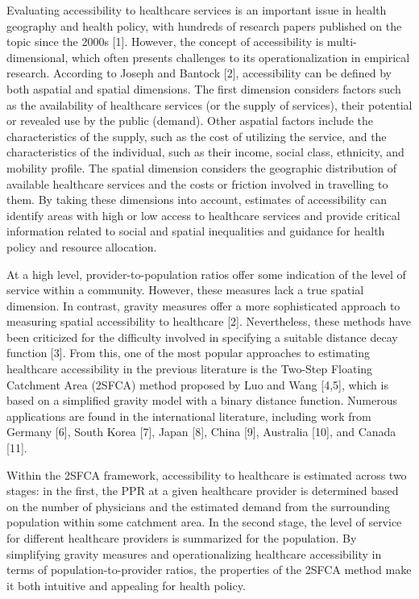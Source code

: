 \documentclass[10pt,letterpaper]{article}
\begin{document}
Evaluating accessibility to healthcare services is an important issue in
health geography and health policy, with hundreds of research papers
published on the topic since the 2000s {[}1{]}. However, the concept of
accessibility is multi-dimensional, which often presents challenges to
its operationalization in empirical research. According to Joseph and
Bantock {[}2{]}, accessibility can be defined by both aspatial and
spatial dimensions. The first dimension considers factors such as the
availability of healthcare services (or the supply of services), their
potential or revealed use by the public (demand). Other aspatial factors
include the characteristics of the supply, such as the cost of utilizing
the service, and the characteristics of the individual, such as their
income, social class, ethnicity, and mobility profile. The spatial
dimension considers the geographic distribution of available healthcare
services and the costs or friction involved in travelling to them. By
taking these dimensions into account, estimates of accessibility can
identify areas with high or low access to healthcare services and
provide critical information related to social and spatial inequalities
and guidance for health policy and resource allocation.

At a high level, provider-to-population ratios offer some indication of
the level of service within a community. However, these measures lack a
true spatial dimension. In contrast, gravity measures offer a more
sophisticated approach to measuring spatial accessibility to healthcare
{[}2{]}. Nevertheless, these methods have been criticized for the
difficulty involved in specifying a suitable distance decay function
{[}3{]}. From this, one of the most popular approaches to estimating
healthcare accessibility in the previous literature is the Two-Step
Floating Catchment Area (2SFCA) method proposed by Luo and Wang
{[}4,5{]}, which is based on a simplified gravity model with a binary
distance function. Numerous applications are found in the international
literature, including work from Germany {[}6{]}, South Korea {[}7{]},
Japan {[}8{]}, China {[}9{]}, Australia {[}10{]}, and Canada {[}11{]}.

Within the 2SFCA framework, accessibility to healthcare is estimated
across two stages: in the first, the PPR at a given healthcare provider
is determined based on the number of physicians and the estimated demand
from the surrounding population within some catchment area. In the
second stage, the level of service for different healthcare providers is
summarized for the population. By simplifying gravity measures and
operationalizing healthcare accessibility in terms of
population-to-provider ratios, the properties of the 2SFCA method make
it both intuitive and appealing for health policy.
\end{document}
